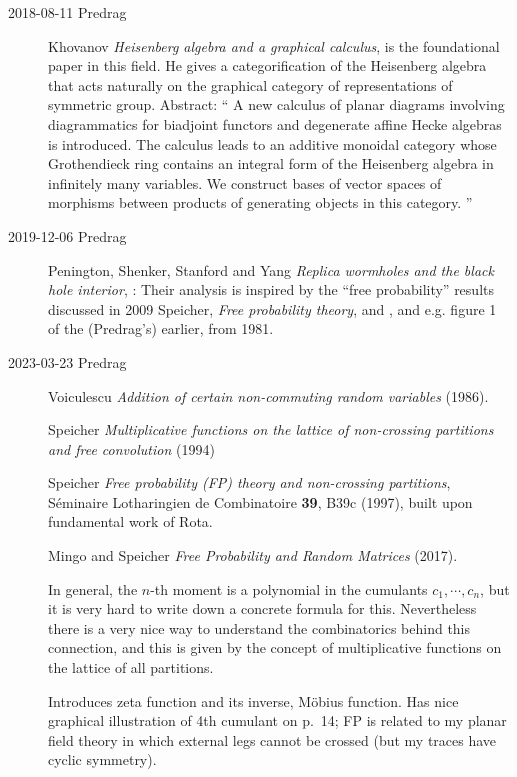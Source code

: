 \begin{description}
\item[2018-08-11 Predrag]
Khovanov {\em Heisenberg algebra and a graphical calculus},
 is the foundational paper in this field.
He gives a categorification of the Heisenberg algebra that acts naturally
on the graphical category of representations  of  symmetric  group.
Abstract: ``
A new calculus of planar diagrams involving diagrammatics for biadjoint
functors and degenerate affine Hecke algebras is introduced. The calculus
leads to an additive monoidal category whose Grothendieck ring contains
an integral form of the Heisenberg algebra in infinitely many variables.
We construct bases of vector spaces of morphisms between products of
generating objects in this category.
''

\item[2019-12-06 Predrag]
\label{post:PSSY19}
Penington, Shenker, Stanford and Yang
{\em Replica wormholes and the black hole interior},
:
Their analysis is inspired by the ``free probability'' results discussed
in 2009 Speicher, {\em Free probability theory},
 and , and e.g. figure 1 of the (Predrag's)
earlier, from 1981.

   \item[2023-03-23 Predrag]
Voiculescu
{\em Addition of certain non-commuting random variables} (1986).

Speicher {\em Multiplicative functions on the lattice of
non-crossing partitions and free convolution} (1994)

Speicher {\em Free probability (FP) theory and non-crossing partitions},
S{\'e}minaire Lotharingien de Combinatoire
     {{\bf 39}, B39c} (1997),
built upon fundamental work of Rota.

Mingo and Speicher
{\em Free Probability and Random Matrices} (2017).

In general, the $n$-th moment is a polynomial in the cumulants $c_1, \cdots ,
c_n$, but it is very hard to write down a concrete formula for this.
Nevertheless there is a very nice way to understand the combinatorics
behind this connection, and this is given by the concept of multiplicative
functions on the lattice of all partitions.

Introduces zeta function and its inverse, M{\"o}bius function. Has nice
graphical illustration of 4th cumulant on p.~14; FP is related to my planar
field theory in which external legs cannot be crossed (but my traces have
cyclic symmetry).



\end{description}

